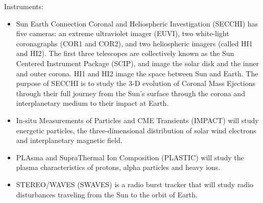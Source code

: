 \documentclass{article}
\begin{document}
Instruments:
\begin{itemize}
    \item Sun Earth Connection Coronal and Heliospheric Investigation
        (SECCHI) has five cameras: an extreme ultraviolet imager (EUVI),
        two white-light coronagraphs (COR1 and COR2), and two heliospheric
        imagers (called HI1 and HI2). The first three telescopes are
        collectively known as the Sun Centered Instrument Package (SCIP),
        and image the solar disk and the inner and outer corona. HI1 and
        HI2 image the space between Sun and Earth. The purpose of SECCHI is
        to study the 3-D evolution of Coronal Mass Ejections through their
        full journey from the Sun's surface through the corona and
        interplanetary medium to their impact at Earth.
    \item In-situ Measurements of Particles and CME Transients (IMPACT) will
        study energetic particles, the three-dimensional distribution of
        solar wind electrons and interplanetary magnetic field.
    \item PLAsma and SupraThermal Ion Composition (PLASTIC) will study the
        plasma characteristics of protons, alpha particles and heavy
        ions.
    \item STEREO/WAVES (SWAVES) is a radio burst tracker that will study
        radio disturbances traveling from the Sun to the orbit of
        Earth.
\end{itemize}
\end{document}
